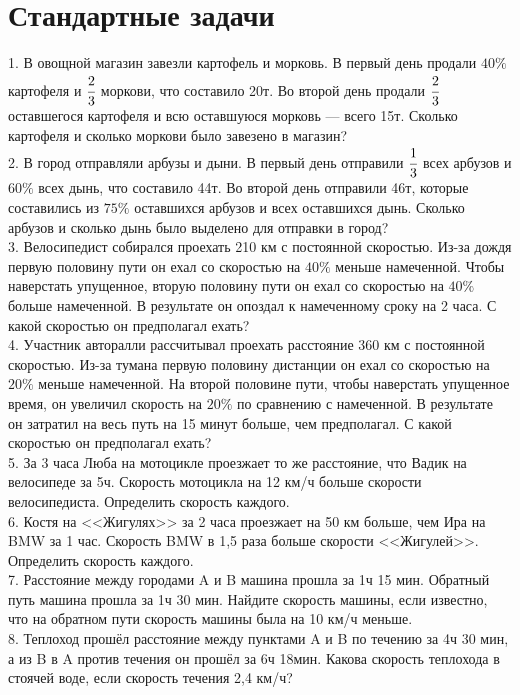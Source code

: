 \documentclass[12pt]{article}
\begin{document}
\section{Стандартные задачи}
1. В овощной магазин завезли картофель и морковь. В первый день продали $40\%$ картофеля и $\cfrac{2}{3}$ моркови, что составило 20т. Во второй день продали $\cfrac{2}{3}$ оставшегося картофеля и всю оставшуюся морковь --- всего 15т. Сколько картофеля и сколько моркови было завезено в магазин?\\
2. В город отправляли арбузы и дыни. В первый день отправили $\cfrac{1}{3}$ всех арбузов и $60\%$ всех дынь, что составило 44т. Во второй день отправили 46т, которые составились из $75\%$ оставшихся арбузов и всех оставшихся дынь. Сколько арбузов и сколько дынь было выделено для отправки в город?\\
3. Велосипедист собирался проехать 210 км с постоянной скоростью. Из-за дождя первую половину пути он ехал со скоростью на $40\%$ меньше намеченной. Чтобы наверстать упущенное, вторую половину пути он ехал со скоростью на $40\%$ больше намеченной. В результате он опоздал к намеченному сроку на 2 часа. С какой скоростью он предполагал ехать?\\
4. Участник авторалли рассчитывал проехать расстояние 360 км с постоянной скоростью. Из-за тумана первую половину дистанции он ехал со скоростью на $20\%$ меньше намеченной. На второй половине пути, чтобы наверстать упущенное время, он увеличил скорость на $20\%$ по сравнению с намеченной. В результате он затратил на весь путь на 15 минут больше, чем предполагал. С какой скоростью он предполагал ехать?\\
5. За 3 часа Люба на мотоцикле проезжает то же расстояние,  что Вадик на велосипеде за 5ч. Скорость мотоцикла на 12 км/ч больше скорости велосипедиста. Определить скорость каждого.\\
6. Костя на <<Жигулях>> за 2 часа проезжает на 50 км больше, чем Ира на BMW за 1 час. Скорость BMW в 1,5 раза больше скорости <<Жигулей>>. Определить скорость каждого.\\
7. Расстояние между городами A и B машина прошла за 1ч 15 мин. Обратный путь машина прошла за 1ч 30 мин. Найдите скорость машины, если известно, что на обратном пути скорость машины была на 10 км/ч меньше.\\
8. Теплоход прошёл расстояние между пунктами A и B по течению за 4ч 30 мин, а из B в A против течения он прошёл за 6ч 18мин. Какова скорость теплохода в стоячей воде, если скорость течения 2,4 км/ч?\\
\end{document}
